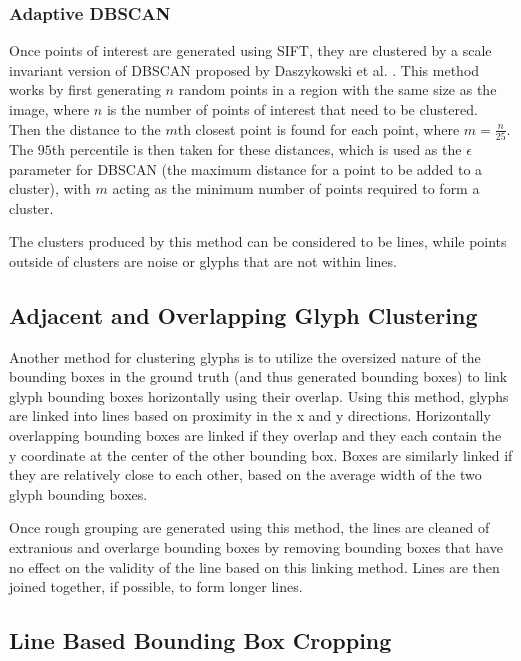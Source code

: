 \subsubsection{Adaptive DBSCAN}

Once points of interest are generated using SIFT, they are clustered by a scale invariant version of DBSCAN proposed by Daszykowski et al. \cite{Daszykowski}. This method works by first generating $n$ random points in a region with the same size as the image, where $n$ is the number of points of interest that need to be clustered. Then the distance to the $m$th closest point is found for each point, where $m = \frac{n}{25}$. The $95$th percentile is then taken for these distances, which is used as the $\epsilon$ parameter for DBSCAN (the maximum distance for a point to be added to a cluster), with $m$ acting as the minimum number of points required to form a cluster.

The clusters produced by this method can be considered to be lines, while points outside of clusters are noise or glyphs that are not within lines.

\subsection{Adjacent and Overlapping Glyph Clustering}

Another method for clustering glyphs is to utilize the oversized nature of the bounding boxes in the ground truth (and thus generated bounding boxes) to link glyph bounding boxes horizontally using their overlap. Using this method, glyphs are linked into lines based on proximity in the x and y directions. Horizontally overlapping bounding boxes are linked if they overlap and they each contain the y coordinate at the center of the other bounding box. Boxes are similarly linked if they are relatively close to each other, based on the average width of the two glyph bounding boxes.

Once rough grouping are generated using this method, the lines are cleaned of extranious and overlarge bounding boxes by removing bounding boxes that have no effect on the validity of the line based on this linking method. Lines are then joined together, if possible, to form longer lines.

\subsection{Line Based Bounding Box Cropping}

